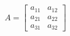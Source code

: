\documentclass[preview]{standalone}
\begin{document}
\begin{align*}
A = \begin{bmatrix} a_{11} & a_{12} \\ a_{21} & a_{22} \\ a_{31} & a_{32} \end{bmatrix}
\end{align*}
\end{document}
